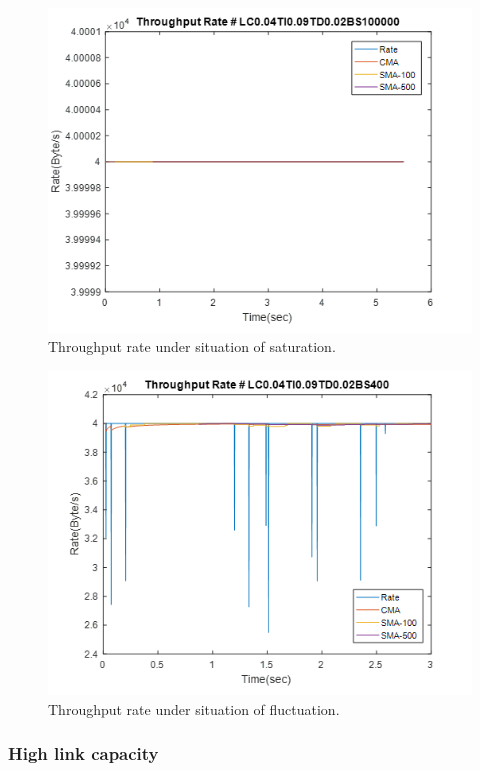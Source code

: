 \documentclass[a4paper]{article}
\begin{document}
\begin{figure}
\centering
\includegraphics[width=1\textwidth]{sat.png}
\caption{\label{fig:sat}Throughput rate under situation of saturation.}
\end{figure}

\begin{figure}
\centering
\includegraphics[width=1\textwidth]{fluc.png}
\caption{\label{fig:fluc}Throughput rate under situation of fluctuation.}
\end{figure}

\subsubsection{High link capacity}
\end{document}

